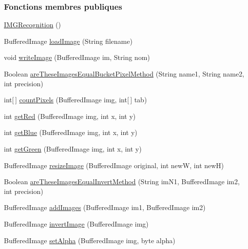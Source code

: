 \subsubsection*{Fonctions membres publiques}
\begin{DoxyCompactItemize}
\item 
\hyperlink{classmain_1_1IMGRecognition_ad3a4c7df4f9a57b7b651ec87432f7427}{I\+M\+G\+Recognition} ()
\item 
Buffered\+Image \hyperlink{classmain_1_1IMGRecognition_aaa715f046dad799280c48bf91abed47e}{load\+Image} (String filename)
\item 
void \hyperlink{classmain_1_1IMGRecognition_ad08ec39dbf190463dade62d96fcb3809}{write\+Image} (Buffered\+Image im, String nom)
\item 
Boolean \hyperlink{classmain_1_1IMGRecognition_a9c1b15071aec2401dbcd196089bf0410}{are\+These\+Images\+Equal\+Bucket\+Pixel\+Method} (String name1, String name2, int precision)
\item 
int\mbox{[}$\,$\mbox{]} \hyperlink{classmain_1_1IMGRecognition_a485c324e088c83d9b14e73a3d2b31bf7}{count\+Pixels} (Buffered\+Image img, int\mbox{[}$\,$\mbox{]} tab)
\item 
int \hyperlink{classmain_1_1IMGRecognition_a081b6ae5204140c4cb0da69e181cf334}{get\+Red} (Buffered\+Image img, int x, int y)
\item 
int \hyperlink{classmain_1_1IMGRecognition_a35e1dab265347a43b66b0b023b0205c4}{get\+Blue} (Buffered\+Image img, int x, int y)
\item 
int \hyperlink{classmain_1_1IMGRecognition_abf7642a1359d08a759c0e36fd8b9f0d2}{get\+Green} (Buffered\+Image img, int x, int y)
\item 
Buffered\+Image \hyperlink{classmain_1_1IMGRecognition_ab370e4f70a8a19a9cdcbc8972bc3e86f}{resize\+Image} (Buffered\+Image original, int new\+W, int new\+H)
\item 
Boolean \hyperlink{classmain_1_1IMGRecognition_ad83e42f0ca9930d8b14ebe859e508241}{are\+These\+Images\+Equal\+Invert\+Method} (String im\+N1, Buffered\+Image im2, int precision)
\item 
Buffered\+Image \hyperlink{classmain_1_1IMGRecognition_a82048c15daa3bbb8e930b0af41c96fb4}{add\+Images} (Buffered\+Image im1, Buffered\+Image im2)
\item 
Buffered\+Image \hyperlink{classmain_1_1IMGRecognition_ac3c82596f3127a48f0093b479ee9d450}{invert\+Image} (Buffered\+Image img)
\item 
Buffered\+Image \hyperlink{classmain_1_1IMGRecognition_aba224b9de06ccbcd28bed1fb041ca336}{set\+Alpha} (Buffered\+Image img, byte alpha)

\end{DoxyCompactItemize}
